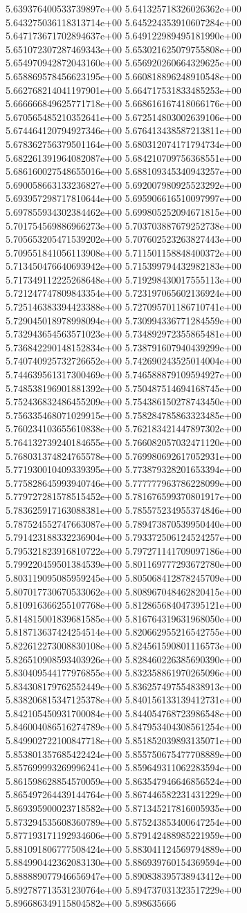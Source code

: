 5.639376400533739897e+00	5.641325718326026362e+00	5.643275036118313714e+00	5.645224353910607284e+00	5.647173671702894637e+00	5.649122989495181990e+00	5.651072307287469343e+00	5.653021625079755808e+00	5.654970942872043160e+00	5.656920260664329625e+00	5.658869578456623195e+00	5.660818896248910548e+00	5.662768214041197901e+00	5.664717531833485253e+00	5.666666849625771718e+00	5.668616167418066176e+00	5.670565485210352641e+00	5.672514803002639106e+00	5.674464120794927346e+00	5.676413438587213811e+00	5.678362756379501164e+00	5.680312074171794734e+00	5.682261391964082087e+00	5.684210709756368551e+00	5.686160027548655016e+00	5.688109345340943257e+00	5.690058663133236827e+00	5.692007980925523292e+00	5.693957298717810644e+00	5.695906616510097997e+00	5.697855934302384462e+00	5.699805252094671815e+00	5.701754569886966273e+00	5.703703887679252738e+00	5.705653205471539202e+00	5.707602523263827443e+00	5.709551841056113908e+00	5.711501158848400372e+00	5.713450476640693942e+00	5.715399794432982183e+00	5.717349112225268648e+00	5.719298430017555113e+00	5.721247747809843354e+00	5.723197065602136924e+00	5.725146383394423388e+00	5.727095701186710741e+00	5.729045018978998094e+00	5.730994336771284559e+00	5.732943654563571023e+00	5.734892972355865481e+00	5.736842290148152834e+00	5.738791607940439299e+00	5.740740925732726652e+00	5.742690243525014004e+00	5.744639561317300469e+00	5.746588879109594927e+00	5.748538196901881392e+00	5.750487514694168745e+00	5.752436832486455209e+00	5.754386150278743450e+00	5.756335468071029915e+00	5.758284785863323485e+00	5.760234103655610838e+00	5.762183421447897302e+00	5.764132739240184655e+00	5.766082057032471120e+00	5.768031374824765578e+00	5.769980692617052931e+00	5.771930010409339395e+00	5.773879328201653394e+00	5.775828645993940746e+00	5.777777963786228099e+00	5.779727281578515452e+00	5.781676599370801917e+00	5.783625917163088381e+00	5.785575234955374846e+00	5.787524552747663087e+00	5.789473870539950440e+00	5.791423188332236904e+00	5.793372506124524257e+00	5.795321823916810722e+00	5.797271141709097186e+00	5.799220459501384539e+00	5.801169777293672780e+00	5.803119095085959245e+00	5.805068412878245709e+00	5.807017730670533062e+00	5.808967048462820415e+00	5.810916366255107768e+00	5.812865684047395121e+00	5.814815001839681585e+00	5.816764319631968050e+00	5.818713637424254514e+00	5.820662955216542755e+00	5.822612273008830108e+00	5.824561590801116573e+00	5.826510908593403926e+00	5.828460226385690390e+00	5.830409544177976855e+00	5.832358861970265096e+00	5.834308179762552449e+00	5.836257497554838913e+00	5.838206815347125378e+00	5.840156133139412731e+00	5.842105450931700084e+00	5.844054768723986548e+00	5.846004086516274789e+00	5.847953404308561254e+00	5.849902722100847718e+00	5.851852039893135071e+00	5.853801357685422424e+00	5.855750675477708889e+00	5.857699993269996241e+00	5.859649311062283594e+00	5.861598628854570059e+00	5.863547946646856524e+00	5.865497264439144764e+00	5.867446582231431229e+00	5.869395900023718582e+00	5.871345217816005935e+00	5.873294535608360789e+00	5.875243853400647254e+00	5.877193171192934606e+00	5.879142488985221959e+00	5.881091806777508424e+00	5.883041124569794889e+00	5.884990442362083130e+00	5.886939760154369594e+00	5.888889077946656947e+00	5.890838395738943412e+00	5.892787713531230764e+00	5.894737031323517229e+00	5.896686349115804582e+00	5.898635666